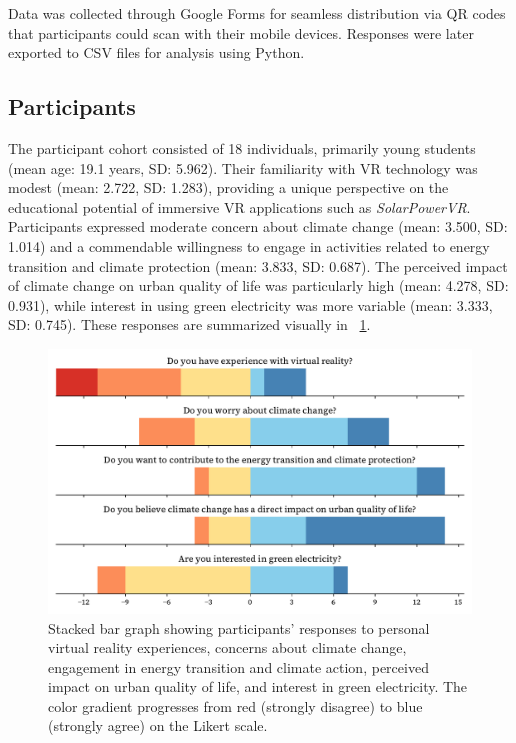 \documentclass[draft, final]{vutinfth} %
\begin{document}
Data was collected through Google Forms for seamless distribution via QR codes that participants could scan with their mobile devices. Responses were later exported to CSV files for analysis using Python.

\subsection{Participants}
The participant cohort consisted of 18 individuals, primarily young students (mean age: 19.1 years, SD: 5.962). Their familiarity with VR technology was modest (mean: 2.722, SD: 1.283), providing a unique perspective on the educational potential of immersive VR applications such as \textit{SolarPowerVR}. Participants expressed moderate concern about climate change (mean: 3.500, SD: 1.014) and a commendable willingness to engage in activities related to energy transition and climate protection (mean: 3.833, SD: 0.687). The perceived impact of climate change on urban quality of life was particularly high (mean: 4.278, SD: 0.931), while interest in using green electricity was more variable (mean: 3.333, SD: 0.745). These responses are summarized visually in \figurename~\ref{fig:participants_solarpowervr}.

\begin{figure}[h]
    \centering
    \includegraphics[width=\textwidth]{graphics/participants-solarpowervr.pdf}
    \caption[Participant Responses Summary]{Stacked bar graph showing participants' responses to personal virtual reality experiences, concerns about climate change, engagement in energy transition and climate action, perceived impact on urban quality of life, and interest in green electricity. The color gradient progresses from red (strongly disagree) to blue (strongly agree) on the Likert scale.}
    \label{fig:participants_solarpowervr}
\end{figure}
\end{document}
